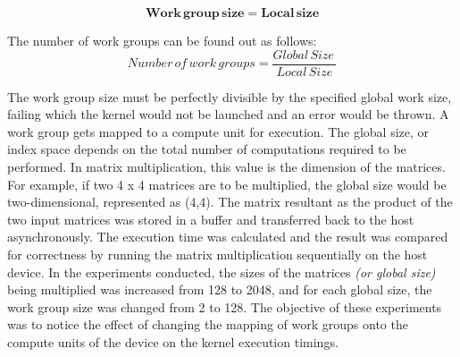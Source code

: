 \begin{equation}
\mathbf{Work\, group\, size = Local\, size}
\end{equation}

The number of work groups can be found out as follows:
\[Number \, of \, work \, groups=\frac{Global \, Size \,}{Local \, Size}\]

The work group size must be perfectly divisible by the specified global work size, failing which the kernel would not be launched and an error would be thrown. A work group gets mapped to a compute unit for execution. \newline\newline
The global size, or index space depends on the total number of computations required to be performed. In matrix multiplication, this value is the dimension of the matrices. For example, if two 4 x 4 matrices are to be multiplied, the global size would be two-dimensional, represented as (4,4). \newline\newline
The matrix resultant as the product of the two input matrices was stored in a buffer and transferred back to the host asynchronously. The execution time was calculated and the result was compared for correctness by running the matrix multiplication sequentially on the host device.\newline\newline
In the experiments conducted, the sizes of the matrices \textit{(or global size)} being multiplied was increased from 128 to 2048, and for each global size, the work group size was changed from 2 to 128. The objective of these experiments was to notice the effect of changing the mapping of work groups onto the compute units of the device on the kernel execution timings.

